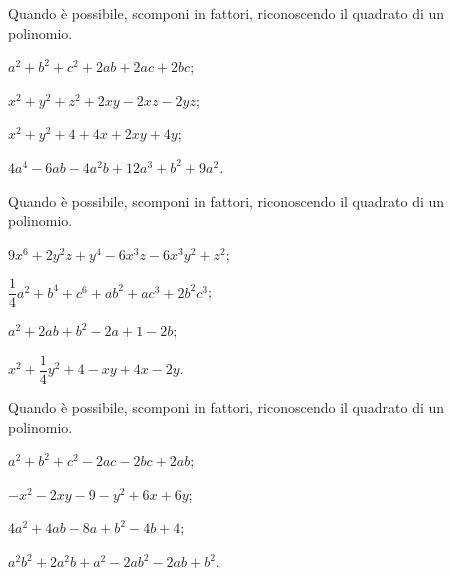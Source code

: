 
\begin{esercizio}
\label{ese:13.45}
Quando è possibile, scomponi in fattori, riconoscendo il quadrato di un polinomio.
\begin{multicols}{2}
\begin{enumeratea}
 \item $a^{2}+b^{2}+c^{2}+2ab+2ac+2bc$;
 \item $x^{2}+y^{2}+z^{2}+2xy-2xz-2yz$;
 \item $x^{2}+y^{2}+4+4x+2xy+4y$;
 \item $4a^{4}-6{ab}-4a^{2}b+12a^{3}+b^{2}+9a^{2}$.
\end{enumeratea}
\end{multicols}
\end{esercizio}

\begin{esercizio}
Quando è possibile, scomponi in fattori, riconoscendo il quadrato di un polinomio.
\label{ese:13.46}
\begin{multicols}{2}
\begin{enumeratea}
 \item $9x^{6}+2y^{2}z+y^{4}-6x^{3}z-6x^{3}y^{2}+z^{2}$;
 \item $\dfrac{1}{4}a^{2}+b^{4}+c^{6}+ab^{2}+{ac}^{3}+2b^{2}c^{3}$;
 \item $a^{2}+2ab+b^{2}-2a+1-2b$;
 \item $x^{2}+\dfrac{1}{4}y^{2}+4-xy+4x-2y$.
\end{enumeratea}
\end{multicols}
\end{esercizio}

\begin{esercizio}
\label{ese:13.47}
Quando è possibile, scomponi in fattori, riconoscendo il quadrato di un polinomio.
\begin{multicols}{2}
\begin{enumeratea}
 \item $a^{2}+b^{2}+c^{2}-2ac-2bc+2ab$;
 \item $-x^{2}-2xy-9-y^{2}+6x+6y$;
 \item $4a^{2}+4ab-8a+b^{2}-4b+4$;
 \item $a^{2}b^{2}+2a^{2}b+a^{2}-2ab^{2}-2ab+b^{2}$.
\end{enumeratea}
\end{multicols}
\end{esercizio}

